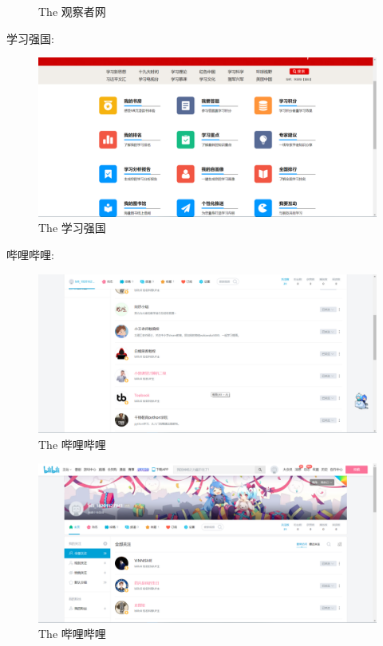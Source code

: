 \documentclass{article}
\begin{document}
\begin{itemize}
\begin{figure}[h!]
    		\caption{The 观察者网}
    		\label{fig:guan2}
    	\end{figure}
    		学习强国:
    		\begin{figure}[h!]
    		\centering
    		\includegraphics[scale=0.5]{xue}
    		\caption{The 学习强国}
    		\label{fig:xue}
    		\end{figure}
    		哔哩哔哩:
    		\begin{figure}[h!]
    			\centering
    			\includegraphics[scale=0.5]{b1}
    			\caption{The 哔哩哔哩}
    			\label{fig:b1}
    		\end{figure}
    	\begin{figure}[h!]
    		\centering
    		\includegraphics[scale=0.5]{b2}
    		\caption{The 哔哩哔哩}

\end{figure}
\end{itemize}
\end{document}
